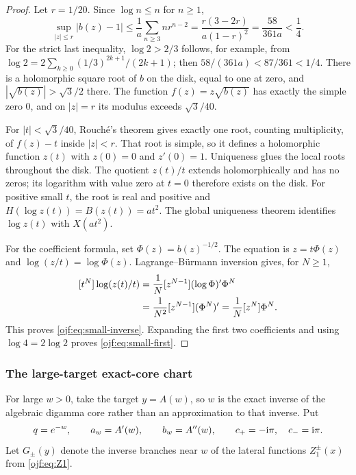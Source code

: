 \begin{proof}
Let $r=1/20$. Since $\log n\le n$ for $n\ge1$,
\[
 \sup_{|z|\le r}|b(z)-1|
 \le\frac1a\sum_{n\ge3}n r^{n-2}
 =\frac{r(3-2r)}{a(1-r)^2}
 =\frac{58}{361a}<\frac14.
\]
For the strict last inequality, $\log2>2/3$ follows, for example, from
$\log2=2\sum_{k\ge0}(1/3)^{2k+1}/(2k+1)$; then
$58/(361a)<87/361<1/4$.
There is a holomorphic square root of $b$ on the disk, equal to one
at zero, and $|\sqrt{b(z)}|>\sqrt3/2$ there. The function
$f(z)=z\sqrt{b(z)}$ has exactly the simple zero $0$, and on $|z|=r$
its modulus exceeds $\sqrt3/40$.

For $|t|<\sqrt3/40$, Rouch\'e's theorem gives exactly one root,
counting multiplicity, of $f(z)-t$ inside $|z|<r$. That root is simple,
so it defines a holomorphic function $z(t)$ with $z(0)=0$ and
$z'(0)=1$. Uniqueness glues the local roots throughout the disk.
The quotient $z(t)/t$ extends holomorphically and has no zeros;
its logarithm with value zero at $t=0$ therefore exists on the disk.
For positive small $t$, the root is real and positive and
$H(\log z(t))=B(z(t))=at^2$. The global uniqueness theorem identifies
$\log z(t)$ with $X(at^2)$.

For the coefficient formula, set $\Phi(z)=b(z)^{-1/2}$. The equation
is $z=t\Phi(z)$ and $\log(z/t)=\log\Phi(z)$.
Lagrange--B\"urmann inversion gives, for $N\ge1$,
\begin{align*}
 [t^{N}]\log(z(t)/t)
 &=\frac1N[z^{N-1}](\log\Phi)'\Phi^N\\
 &=\frac1{N^2}[z^{N-1}](\Phi^N)'
  =\frac1N[z^{N}]\Phi^N.
\end{align*}
This proves \eqref{ojf:eq:small-inverse}. Expanding the first two
coefficients and using $\log4=2\log2$ proves
\eqref{ojf:eq:small-first}.
\end{proof}

\subsubsection{The large-target exact-core chart}
For large $w>0$, take the target $y=A(w)$, so $w$ is the exact
inverse of the algebraic digamma core rather than an approximation to
that inverse. Put
\begin{equation}\label{ojf:eq:large-notations}
 q=e^{-w},\qquad a_w=A'(w),\qquad b_w=A''(w),\qquad
 c_+=-\mathrm{i}\pi,\quad c_-=\mathrm{i}\pi.
\end{equation}
Let $G_\pm(y)$ denote the inverse branches near $w$ of the lateral
functions $Z_1^\pm(x)$ from \eqref{ojf:eq:Z1}.

